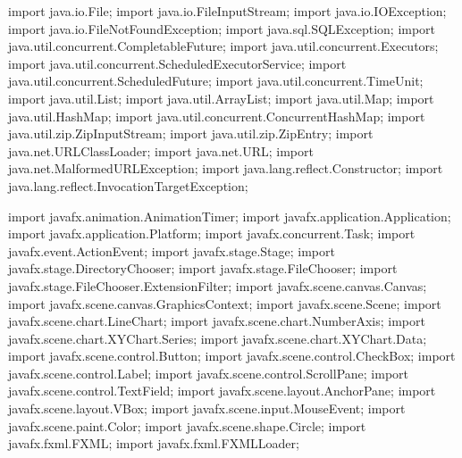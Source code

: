 \nwenddocs{}\plusendmoddef
import java.io.File;
import java.io.FileInputStream;
import java.io.IOException;
import java.io.FileNotFoundException;
import java.sql.SQLException;
import java.util.concurrent.CompletableFuture;
import java.util.concurrent.Executors;
import java.util.concurrent.ScheduledExecutorService;
import java.util.concurrent.ScheduledFuture;
import java.util.concurrent.TimeUnit;
import java.util.List;
import java.util.ArrayList;
import java.util.Map;
import java.util.HashMap;
import java.util.concurrent.ConcurrentHashMap;
import java.util.zip.ZipInputStream;
import java.util.zip.ZipEntry;
import java.net.URLClassLoader;
import java.net.URL;
import java.net.MalformedURLException;
import java.lang.reflect.Constructor;
import java.lang.reflect.InvocationTargetException;
\nwendcode{}\nwdocspar

\nwenddocs{}\plusendmoddef
import javafx.animation.AnimationTimer;
import javafx.application.Application;
import javafx.application.Platform;
import javafx.concurrent.Task;
import javafx.event.ActionEvent;
import javafx.stage.Stage;
import javafx.stage.DirectoryChooser;
import javafx.stage.FileChooser;
import javafx.stage.FileChooser.ExtensionFilter;
import javafx.scene.canvas.Canvas;
import javafx.scene.canvas.GraphicsContext;
import javafx.scene.Scene;
import javafx.scene.chart.LineChart;
import javafx.scene.chart.NumberAxis;
import javafx.scene.chart.XYChart.Series;
import javafx.scene.chart.XYChart.Data;
import javafx.scene.control.Button;
import javafx.scene.control.CheckBox;
import javafx.scene.control.Label;
import javafx.scene.control.ScrollPane;
import javafx.scene.control.TextField;
import javafx.scene.layout.AnchorPane;
import javafx.scene.layout.VBox;
import javafx.scene.input.MouseEvent;
import javafx.scene.paint.Color;
import javafx.scene.shape.Circle;
import javafx.fxml.FXML;
import javafx.fxml.FXMLLoader;
\nwendcode{}\nwdocspar

